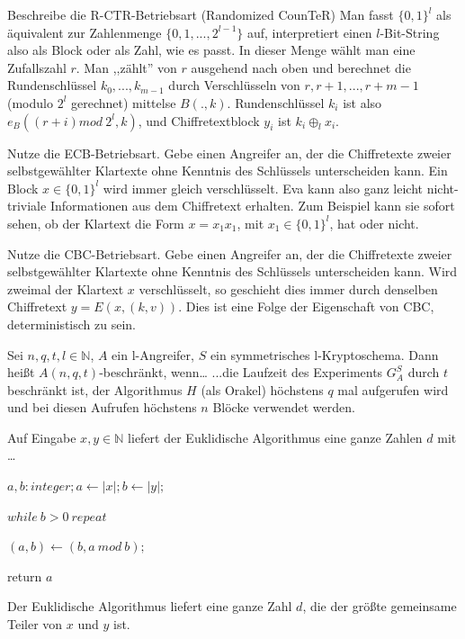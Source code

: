 \documentclass[avery5371, frame]{flashcards}
\begin{document}
\begin{flashcard}[Betriebsarten]{Beschreibe die R-CTR-Betriebsart (Randomized CounTeR)}
    Man fasst $\{0,1\}^l$ als äquivalent zur Zahlenmenge $\{0,1,...,2^{l-1}\}$ auf, interpretiert einen $l$-Bit-String also als Block oder als Zahl, wie es passt. In dieser Menge wählt man eine Zufallszahl $r$. Man ,,zählt'' von $r$ ausgehend nach oben und berechnet die Rundenschlüssel $k_0,...,k_{m-1}$ durch Verschlüsseln von $r,r+1,...,r+m-1$ (modulo $2^l$ gerechnet) mittelse $B(.,k)$. Rundenschlüssel $k_i$ ist also $e_B((r+i) mod\ 2^l,k)$, und Chiffretextblock $y_i$ ist $k_i\oplus_l x_i$.
\end{flashcard}

\begin{flashcard}[Betriebsarten]{Nutze die ECB-Betriebsart. Gebe einen Angreifer an, der die Chiffretexte zweier selbstgewählter Klartexte ohne Kenntnis des Schlüssels unterscheiden kann.}
    Ein Block $x\in\{0,1\}^l$ wird immer gleich verschlüsselt. Eva kann also ganz leicht nicht-triviale Informationen aus dem Chiffretext erhalten.
    Zum Beispiel kann sie sofort sehen, ob der Klartext die Form $x=x_1 x_1$, mit $x_1\in\{0,1\}^l$, hat oder nicht.
\end{flashcard}

\begin{flashcard}[Betriebsarten]{Nutze die CBC-Betriebsart. Gebe einen Angreifer an, der die Chiffretexte zweier selbstgewählter Klartexte ohne Kenntnis des Schlüssels unterscheiden kann.}
    Wird zweimal der Klartext $x$ verschlüsselt, so geschieht dies immer durch denselben Chiffretext $y=E(x,(k,v))$. Dies ist eine Folge der Eigenschaft von CBC, deterministisch zu sein.
\end{flashcard}

\begin{flashcard}{Sei $n,q,t,l\in\mathbb{N}$, $A$ ein l-Angreifer, $S$ ein symmetrisches l-Kryptoschema. Dann heißt $A(n,q,t)$-beschränkt, wenn\dots }
    ...die Laufzeit des Experiments $G^S_A$ durch $t$ beschränkt ist, der Algorithmus $H$ (als Orakel) höchstens $q$ mal aufgerufen wird und bei diesen Aufrufen höchstens $n$ Blöcke verwendet werden.
\end{flashcard}

\begin{flashcard}[Zahlentheorie]{Auf Eingabe $x,y\in\mathbb{N}$ liefert der Euklidische Algorithmus eine ganze Zahlen $d$ mit \dots}

    \begin{itemize*}
        \item[] $a,b:integer;a\leftarrow |x|;b\leftarrow |y|;$
        \item[] $while\ b> 0\ repeat$
        \begin{itemize*}
            \item[] $(a,b)\leftarrow (b,a\ mod\ b);$ %
        \end{itemize*}
        \item[] return $a$
    \end{itemize*}

    Der Euklidische Algorithmus liefert eine ganze Zahl $d$, die der größte gemeinsame Teiler von $x$ und $y$ ist.
\end{flashcard}
\end{document}
